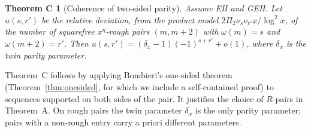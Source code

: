 \documentclass[11pt]{amsart}
\newtheorem*{theoremC}{Theorem C}
\theoremstyle{definition}
\theoremstyle{remark}
\begin{document}
\begin{theoremC}[Coherence of two-sided parity]
Assume EH and GEH. Let $u(s,r')$ be the relative deviation, from the product model $2\Pi_2\nu_s\nu_{r'}x/\log^2x$, of the number of squarefree $x^\eta$-rough pairs $(m,m+2)$ with $\omega(m)=s$ and $\omega(m+2)=r'$. Then $u(s,r')=(\delta_x-1)(-1)^{s+r'}+o(1)$, where $\delta_x$ is the twin parity parameter.
\end{theoremC}

Theorem~C follows by applying Bombieri's one-sided theorem (Theorem~\ref{thm:onesided}, for which we include a self-contained proof) to sequences supported on both sides of the pair. It justifies the choice of $R$-pairs in Theorem~A. On rough pairs the twin parameter $\delta_x$ is the only parity parameter; pairs with a non-rough entry carry a priori different parameters.
\end{document}
